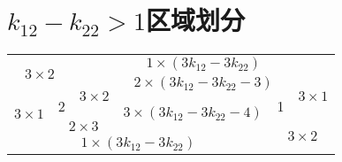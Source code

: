 \section{\texorpdfstring{$k_{12} - k_{22} > 1$}的区域划分}

\begin{table}[h]
    \centering
    \begin{tabular}{|cccccccc|}
        \hline
        \multicolumn{2}{|c|}{\multirow{3}{*}{$3 \times 2$}} & \multicolumn{6}{c|}{$1 \times (3k_{12} - 3k_{22})$}                                                                                                                                                                                \\
        \cline{3-8}
        \multicolumn{2}{|c|}{}                              & \multicolumn{2}{c|}{\multirow{3}{*}{$3 \times 2$}} & \multicolumn{3}{c|}{\multirow{2}{*}{$2 \times (3k_{12} - 3k_{22} - 3)$}} & \multirow{3}{*}{$3 \times 1$}                                                                      \\
        \multicolumn{2}{|c|}{}                              & \multicolumn{2}{c|}{}                              & \multicolumn{3}{c|}{}                                                  &                                                                                                    \\
        \cline{1-2} \cline{5-7}
        \multicolumn{1}{|c|}{\multirow{3}{*}{$3 \times 1$}} & \multicolumn{1}{c|}{2}                             & \multicolumn{2}{c|}{}                                                  & \multicolumn{2}{c|}{\multirow{3}{*}{$3 \times (3k_{12} - 3k_{22} - 4)$}} & \multicolumn{1}{c|}{1} & \\
        \cline{2-4} \cline{7-8}
        \multicolumn{1}{|c|}{}                              & \multicolumn{3}{c|}{\multirow{2}{*}{$2 \times 3$}} & \multicolumn{2}{c|}{}                                                  & \multicolumn{2}{c|}{\multirow{3}{*}{$3 \times 2$}}                                                 \\
        \multicolumn{1}{|c|}{}                              & \multicolumn{3}{c|}{}                              & \multicolumn{2}{c|}{}                                                  & \multicolumn{2}{c|}{}                                                                              \\
        \cline{1-6}
        \multicolumn{6}{|c|}{$1 \times  (3k_{12} - 3k_{22})$} & \multicolumn{2}{c|}{}                                                                                                                                                                                                            \\
        \hline
    \end{tabular}
\end{table}
\endinput
